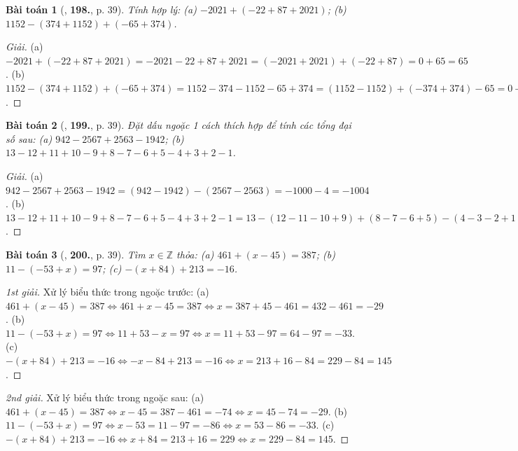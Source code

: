 \documentclass{article}
\numberwithin{equation}{section}
\newtheorem{baitoan}{Bài toán}
\begin{document}
\begin{baitoan}[\cite{Tuyen_Toan_6}, \textbf{198.}, p. 39]
	Tính hợp lý: (a) $-2021 + (-22 + 87 + 2021)$; (b) $1152 - (374 + 1152) + (-65 + 374)$.
\end{baitoan}

\begin{proof}[Giải]
	(a) $-2021 + (-22 + 87 + 2021) = -2021 - 22 + 87 + 2021 = (-2021 + 2021) + (-22 + 87) = 0 + 65 = 65$. (b) $1152 - (374 + 1152) + (-65 + 374) = 1152 - 374 - 1152 - 65 + 374 = (1152 - 1152) + (-374 + 374) - 65 = 0 + 0 - 65 = -65$.
\end{proof}

\begin{baitoan}[\cite{Tuyen_Toan_6}, \textbf{199.}, p. 39]
	Đặt dấu ngoặc 1 cách thích hợp để tính các tổng đại số sau: (a) $942 - 2567 + 2563 - 1942$; (b) $13 - 12 + 11 + 10 - 9 + 8 - 7 - 6 + 5 - 4 + 3 + 2 - 1$.
\end{baitoan}

\begin{proof}[Giải]
	(a) $942 - 2567 + 2563 - 1942 = (942 - 1942) - (2567 - 2563) = -1000 - 4 = -1004$. (b) $13 - 12 + 11 + 10 - 9 + 8 - 7 - 6 + 5 - 4 + 3 + 2 - 1 = 13 - (12 - 11 - 10 + 9) + (8 - 7 - 6 + 5) - (4 - 3 - 2 + 1) = 13 - 0 + 0 - 0 = 13$.
\end{proof}

\begin{baitoan}[\cite{Tuyen_Toan_6}, \textbf{200.}, p. 39]
	Tìm $x\in\mathbb{Z}$ thỏa: (a) $461 + (x - 45) = 387$; (b) $11 - (-53 + x) = 97$; (c) $-(x + 84) + 213 = -16$.
\end{baitoan}

\begin{proof}[1st giải]
	Xử lý biểu thức trong ngoặc trước: (a) $461 + (x - 45) = 387\Leftrightarrow 461 + x - 45 = 387\Leftrightarrow x = 387 + 45 - 461 = 432 - 461 = -29$. (b) $11 - (-53 + x) = 97\Leftrightarrow 11 + 53 - x = 97\Leftrightarrow x = 11 + 53 - 97 = 64 - 97 = -33$. (c) $-(x + 84) + 213 = -16\Leftrightarrow-x - 84 + 213 = -16\Leftrightarrow x = 213 + 16 - 84 = 229 - 84 = 145$.
\end{proof}

\begin{proof}[2nd giải]
	Xử lý biểu thức trong ngoặc sau: (a) $461 + (x - 45) = 387\Leftrightarrow x - 45 = 387 - 461 = -74\Leftrightarrow x = 45 - 74 = - 29$. (b) $11 - (-53 + x) = 97\Leftrightarrow x - 53 = 11 - 97 = -86\Leftrightarrow x = 53 - 86 = -33$. (c) $-(x + 84) + 213 = -16\Leftrightarrow x + 84 = 213 + 16 = 229\Leftrightarrow x = 229 - 84 = 145$.
\end{proof}
\end{document}
